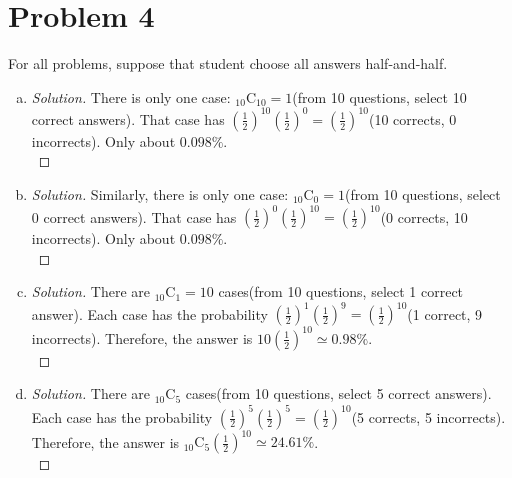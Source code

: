 \section*{Problem 4}
	For all problems, suppose that student choose all answers half-and-half.
	\begin{enumerate} [(a)]
		\item \begin{proof} [Solution]
			There is only one case: $_{10}\mathrm{C}_{10} = 1$(from 10 questions, select 10 correct answers). That case has $\left(\frac{1}{2}\right)^{10}\left(\frac{1}{2}\right)^0 = \left(\frac{1}{2}\right)^{10}$(10 corrects, 0 incorrects). Only about $0.098\%$.\\
		\end{proof}
		\item \begin{proof} [Solution]
			Similarly, there is only one case: $_{10}\mathrm{C}_{0} = 1$(from 10 questions, select 0 correct answers). That case has $\left(\frac{1}{2}\right)^{0}\left(\frac{1}{2}\right)^{10} = \left(\frac{1}{2}\right)^{10}$(0 corrects, 10 incorrects). Only about $0.098\%$.\\
		\end{proof}
		\item \begin{proof} [Solution]
			There are $_{10}\mathrm{C}_{1} = 10$ cases(from 10 questions, select 1 correct answer). Each case has the probability $\left(\frac{1}{2}\right)^{1}\left(\frac{1}{2}\right)^{9} = \left(\frac{1}{2}\right)^{10}$(1 correct, 9 incorrects). Therefore, the answer is $10\left(\frac{1}{2}\right)^{10}\simeq0.98\%$.\\
		\end{proof}
		\item \begin{proof} [Solution]
			There are $_{10}\mathrm{C}_{5}$ cases(from 10 questions, select 5 correct answers). Each case has the probability $\left(\frac{1}{2}\right)^{5}\left(\frac{1}{2}\right)^{5} = \left(\frac{1}{2}\right)^{10}$(5 corrects, 5 incorrects). Therefore, the answer is $_{10}\mathrm{C}_{5}\left(\frac{1}{2}\right)^{10}\simeq24.61\%$.\\
		\end{proof}
	\end{enumerate}